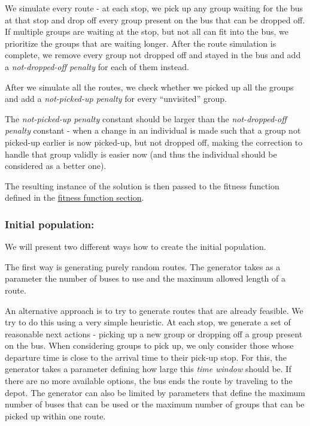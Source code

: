 We simulate every route - at each stop, we pick up any group waiting for the bus at that stop and drop off every group present on the bus that can be dropped off. If multiple groups are waiting at the stop, but not all can fit into the bus, we prioritize the groups that are waiting longer. After the route simulation is complete, we remove every group not dropped off and stayed in the bus and add a \textit{not-dropped-off penalty} for each of them instead.

After we simulate all the routes, we check whether we picked up all the groups and add a \textit{not-picked-up penalty} for every ``unvisited'' group.

The \textit{not-picked-up penalty} constant should be larger than the \textit{not-dropped-off penalty} constant - when a change in an individual is made such that a group not picked-up earlier is now picked-up, but not dropped off, making the correction to handle that group validly is easier now (and thus the individual should be considered as a better one).

The resulting instance of the solution is then passed to the fitness function defined in the \hyperref[sec:fitness]{fitness function section}.

\subsubsection*{Initial population:}

We will present two different ways how to create the initial population.

The first way is generating purely random routes. The generator takes as a parameter the number of buses to use and the maximum allowed length of a route.

An alternative approach is to try to generate routes that are already feasible. We try to do this using a very simple heuristic. At each stop, we generate a set of reasonable next actions - picking up a new group or dropping off a group present on the bus. When considering groups to pick up, we only consider those whose departure time is close to the arrival time to their pick-up stop. For this, the generator takes a parameter defining how large this \textit{time window} should be. If there are no more available options, the bus ends the route by traveling to the depot. The generator can also be limited by parameters that define the maximum number of buses that can be used or the maximum number of groups that can be picked up within one route. 

